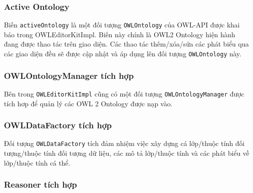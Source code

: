 \subsubsection{Active Ontology}
Biến  \verb|activeOntology| là một đối tượng \verb|OWLOntology| của OWL-API được khai báo trong OWLEditorKitImpl. Biến này chính là OWL2 Ontology hiện hành đang được thao tác trên giao diện. Các thao tác thêm/xóa/sửa các phát biểu qua các giao diện đều sẽ được cập nhật và áp dụng lên đối tượng \verb|OWLOntology| này.
\subsubsection{OWLOntologyManager tích hợp}
Bên trong \verb|OWLEditorKitImpl| cũng có một đối tượng \verb|OWLOntologyManager| được tích hơp để quản lý các OWL 2 Ontology được nạp vào.
\subsubsection{OWLDataFactory tích hợp}
Đối tượng \verb|OWLDataFactory| tích đảm nhiệm việc xây dựng cá lớp/thuộc tính đối tượng/thuộc tính đối tượng dữ liệu, các mô tả lớp/thuộc tính và các phát biểu về lớp/thuộc tính cá thể.
\subsubsection{Reasoner tích hợp}























